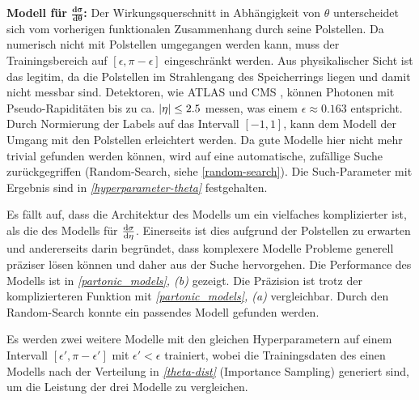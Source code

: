 \textbf{Modell für $\mathbf{\frac{d\sigma}{d\theta}}$:}
Der Wirkungsquerschnitt in Abhängigkeit von $\theta$ unterscheidet sich vom vorherigen funktionalen Zusammenhang durch seine Polstellen. Da numerisch nicht mit Polstellen umgegangen werden kann, muss der Trainingsbereich auf $[\epsilon, \pi-\epsilon]$ eingeschränkt werden. Aus physikalischer Sicht ist das legitim, da die Polstellen im Strahlengang des Speicherrings liegen und damit nicht messbar sind. Detektoren, wie ATLAS \cite{ATLAS} und CMS \cite{CMS}, können Photonen mit Pseudo-Rapiditäten bis zu ca. $\abs{\eta} \leq 2.5$ messen, was einem $\epsilon \approx 0.163$ entspricht. Durch Normierung der Labels auf das Intervall $[-1, 1]$, kann dem Modell der Umgang mit den Polstellen erleichtert werden. Da gute Modelle hier nicht mehr trivial gefunden werden können, wird auf eine automatische, zufällige Suche zurückgegriffen (Random-Search, siehe \textsf{\autoref{random-search}}). Die Such-Parameter mit Ergebnis sind in \textit{\autoref{hyperparameter-theta}} festgehalten.

Es fällt auf, dass die Architektur des Modells um ein vielfaches komplizierter ist, als die des Modells für $\derivative{\sigma}{\eta}$. Einerseits ist dies aufgrund der Polstellen zu erwarten und andererseits darin begründet, dass komplexere Modelle Probleme generell präziser lösen können und daher aus der Suche hervorgehen. Die Performance des Modells ist in \textit{\autoref{partonic_models}, (b)} gezeigt. Die Präzision ist trotz der komplizierteren Funktion mit \textit{\autoref{partonic_models}, (a)} vergleichbar. Durch den Random-Search konnte ein passendes Modell gefunden werden. %

Es werden zwei weitere Modelle mit den gleichen Hyperparametern auf einem Intervall $[\epsilon', \pi-\epsilon']$ mit $\epsilon' < \epsilon$ trainiert, wobei die Trainingsdaten des einen Modells nach der Verteilung in \textit{\autoref{theta-dist}} (Importance Sampling) generiert sind, um die Leistung der drei Modelle zu vergleichen.

